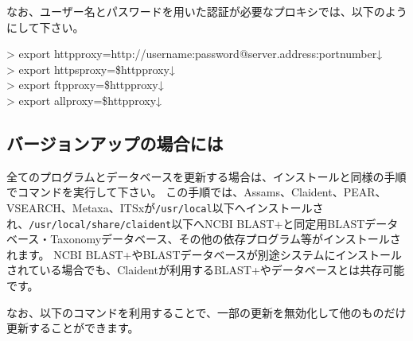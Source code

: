 \documentclass[titlepage,10pt,a4paper]{jsbook}
\newenvironment{cmd}{\begin{oframed}\raggedright\ttfamily\footnotesize\setlength{\baselineskip}{1.4em}}{\end{oframed}\vspace{-1em}}
\begin{document}
なお、ユーザー名とパスワードを用いた認証が必要なプロキシでは、以下のようにして下さい。

\begin{cmd}
{\textgreater} export http{\textunderscore}proxy=http://username:password@server.address:portnumber↓\\
{\textgreater} export https{\textunderscore}proxy=\$http{\textunderscore}proxy↓\\
{\textgreater} export ftp{\textunderscore}proxy=\$http{\textunderscore}proxy↓\\
{\textgreater} export all{\textunderscore}proxy=\$http{\textunderscore}proxy↓
\end{cmd}

\subsection{バージョンアップの場合には}

全てのプログラムとデータベースを更新する場合は、インストールと同様の手順でコマンドを実行して下さい。
この手順では、Assams、Claident、PEAR、VSEARCH、Metaxa、ITSxが\texttt{/usr/local}以下へインストールされ、\texttt{/usr/local/share/claident}以下へNCBI BLAST+と同定用BLASTデータベース・Taxonomyデータベース、その他の依存プログラム等がインストールされます。
NCBI BLAST+やBLASTデータベースが別途システムにインストールされている場合でも、Claidentが利用するBLAST+やデータベースとは共存可能です。

なお、以下のコマンドを利用することで、一部の更新を無効化して他のものだけ更新することができます。
\end{document}
